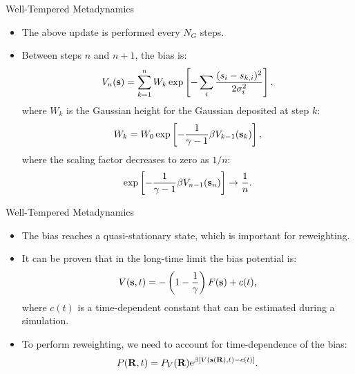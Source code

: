 \documentclass[10pt]{beamer}
\begin{document}
\begin{frame}{Well-Tempered Metadynamics}
\begin{itemize}
\setlength\itemsep{1em}
  \item The above update is performed every $N_G$ steps.

  \item Between steps $n$ and $n+1$, the bias is:
  \begin{equation}
    V_n({\bf s}) = \sum_{k=1}^n W_k \exp\left[ -\sum_i \frac{(s_i-s_{k,i})^2}{2\sigma^2_i} \right],
  \end{equation}
  where $W_k$ is the Gaussian height for the Gaussian deposited at step $k$:
  \begin{equation}
    W_k=W_0\exp\left[ -\frac{1}{\gamma-1} \beta V_{k-1}({\bf s}_k) \right],
  \end{equation}
  where the scaling factor decreases to zero as $1/n$:
  \begin{equation}
    \exp\left[ -\frac{1}{\gamma-1} \beta V_{n-1}({\bf s}_n) \right] \to \frac{1}{n}.
  \end{equation}
\end{itemize}
\end{frame}

\begin{frame}{Well-Tempered Metadynamics}
\begin{itemize}
\setlength\itemsep{1em}
  \item The bias reaches a quasi-stationary state, which is important for reweighting.

  \item It can be proven that in the long-time limit the bias potential is:
  \begin{equation}
    V({\bf s},t)=-\left( 1-\frac{1}{\gamma} \right) F({\bf s}) + c(t),
  \end{equation}
  where $c(t)$ is a time-dependent constant that can be estimated during a simulation.

  \item To perform reweighting, we need to account for time-dependence of the bias:
  \begin{equation}
    P({\bf R},t) = P_V({\bf R})\mathrm{e}^{\beta [V({\bf s}({\bf R}),t)-c(t)]}.
  \end{equation}
\end{itemize}
\end{frame}
\end{document}

